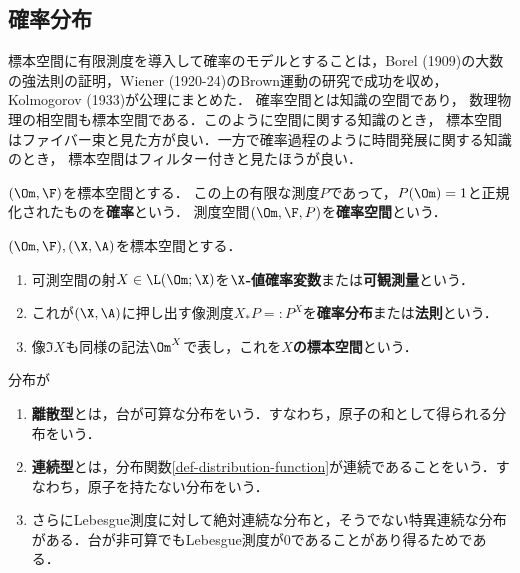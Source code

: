 \documentclass[uplatex,dvipdfmx]{jsreport}
\begin{document}
\subsection{確率分布}

\begin{tcolorbox}[colframe=ForestGreen, colback=ForestGreen!10!white,breakable,colbacktitle=ForestGreen!40!white,coltitle=black,fonttitle=\bfseries\sffamily,
title=]
    標本空間に有限測度を導入して確率のモデルとすることは，Borel (1909)の大数の強法則の証明，Wiener (1920-24)のBrown運動の研究で成功を収め，Kolmogorov (1933)が公理にまとめた．
    確率空間とは知識の空間であり，
    数理物理の相空間も標本空間である．このように空間に関する知識のとき，
    標本空間はファイバー束と見た方が良い．一方で確率過程のように時間発展に関する知識のとき，
    標本空間はフィルター付きと見たほうが良い．
\end{tcolorbox}

\begin{axiom}[probability]
    $(\Om,\F)$を標本空間とする．
    この上の有限な測度$P$であって，$P(\Om)=1$と正規化されたものを\textbf{確率}という．
    測度空間$(\Om,\F,P)$を\textbf{確率空間}という．
\end{axiom}

\begin{definition}
    $(\Om,\F),(\X,\A)$を標本空間とする．
    \begin{enumerate}
        \item 可測空間の射$X\in\L(\Om;\X)$を\textbf{$\X$-値確率変数}または\textbf{可観測量}という．
        \item これが$(\X,\A)$に押し出す像測度$X_*P=:P^X$を\textbf{確率分布}または\textbf{法則}という．
        \item 像$\Im X$も同様の記法$\Om^X$で表し，これを\textbf{$X$の標本空間}という．
    \end{enumerate}
\end{definition}

\begin{definition}
    分布が
    \begin{enumerate}
        \item \textbf{離散型}とは，台が可算な分布をいう．すなわち，原子の和として得られる分布をいう．
        \item \textbf{連続型}とは，分布関数\ref{def-distribution-function}が連続であることをいう．すなわち，原子を持たない分布をいう．
        \item さらにLebesgue測度に対して絶対連続な分布と，そうでない特異連続な分布がある．台が非可算でもLebesgue測度が$0$であることがあり得るためである．
    \end{enumerate}
\end{definition}
\end{document}
